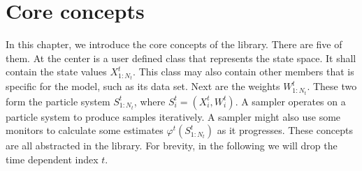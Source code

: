 %
%
%
%

\chapter{Core concepts}
\label{chap:Core concepts}

In this chapter, we introduce the core concepts of the library. There are five
of them. At the center is a user defined class that represents the state space.
It shall contain the state values $X_{1:N_t}^t$. This class may also contain
other members that is specific for the model, such as its data set. Next are
the weights $W_{1:N_t}^t$. These two form the particle system $S_{1:N_t}^t$,
where $S_i^t = (X_i^t,W_i^t)$. A sampler operates on a particle system to
produce samples iteratively. A sampler might also use some monitors to
calculate some estimates $\varphi^t(S_{1:N_t}^t)$ as it progresses. These
concepts are all abstracted in the library. For brevity, in the following we
will drop the time dependent index $t$.


